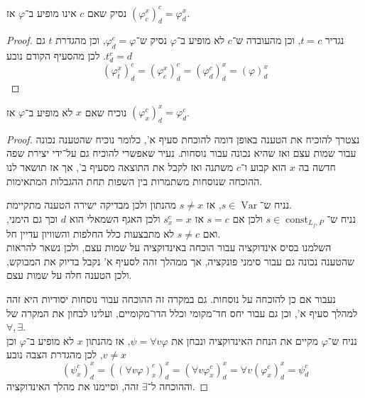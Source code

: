 \subquestion{}
נסיק שאם $c$ אינו מופיע ב־$\varphi$ אז ${(\varphi_c^x)}_d^c = \varphi_d^x$.
\begin{proof}
	נגדיר $t = c$, וכן מהעובדה ש־$c$ לא מופיע ב־$\varphi$ נסיק ש־$\varphi_d^c = \varphi$, וכן מהגדרת $t$ גם $t_d^c = d$.
	לכן מהסעיף הקודם נובע
	\[
		{(\varphi_t^x)}_d^c
		= {(\varphi_c^x)}_d^c
		= {(\varphi_d^c)}_d^x
		= {(\varphi)}_d^x
	\]
\end{proof}

\subquestion{}
נוכיח שאם $x$ לא מופיע ב־$\varphi$ אז ${(\varphi_x^c)}_d^x = \varphi_d^c$.
\begin{proof}
	נצטרך להוכיח את הטענה באופן דומה להוכחת סעיף א', כלומר נוכיח שהטענה נכונה עבור שמות עצם ואז שהיא נכונה עבור נוסחות.
	נעיר שאפשרי להוכיח גם על־ידי יצירת שפה חדשה בה $x$ הוא קבוע ו־$c$ משתנה ואז לקבל את התוצאה מסעיף ב', אך אז תושאר לנו ההוכחה שנוסחות משתמרות בין השפות תחת ההגבלות המתאימות.

	נניח ש־$s \in \operatorname{Var}$, אז $s \ne x$ מהנתון ולכן מבדיקה ישירה הטענה מתקיימת. \\
	נניח ש־$s \in \operatorname{const}_{L_f, P}$ ולכן אם $s = c$ אז $s_x^c = x$ ולכן האגף השמאלי הוא $d$ וכך גם הימני, ואם $s \ne c$ לא מתבצעות כלל החלפות והשוויון עדיין חל. \\
	השלמנו בסיס אינדוקציה עבור הוכחה באינדוקציה על שמות עצם, ולכן נשאר להראות שהטענה נכונה גם עבור סימני פונקציה, אך ממהלך זהה לסעיף א' נקבל בדיוק את המבוקש, ולכן הטענה חלה על שמות עצם.

	נעבור אם כן להוכחה על נוסחות.
	גם במקרה זה ההוכחה עבור נוסחות יסודיות היא זהה למהלך סעיף א', וכן גם עבור יחס חד־מקומי וכלל הדו־מקומיים, ועלינו לבחון את המקרה של $\forall, \exists$. \\
	נניח ש־$\varphi$ מקיים את הנחת האינדוקציה ונבחן את $\psi = \forall v \varphi$, אז מהנתון $x$ לא מופיע ב־$\varphi$ וכן $v \ne x$, לכן מהגדרת הצבה נובע
	\[
		{(\psi_x^c)}_d^x
		= {({(\forall v \varphi)}_x^c)}_d^x
		= {(\forall v \varphi_x^c)}_d^x
		= \forall v {(\varphi_x^c)}_d^x
		= \psi_d^c
	\]
	וההוכחה ל־$\exists$ זהה, וסיימנו את מהלך האינדוקציה.
\end{proof}


